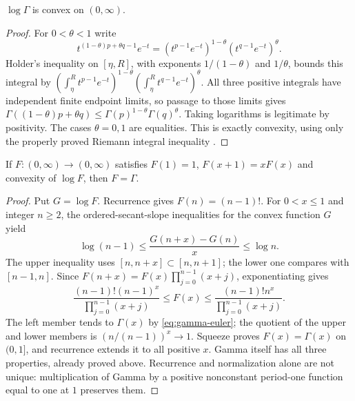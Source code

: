 \begin{theorem}
$\log\Gamma$ is convex on $(0,\infty)$.
\end{theorem}
\begin{proof}
For $0<\theta<1$ write
\[
 t^{(1-\theta)p+\theta q-1}e^{-t}
 =(t^{p-1}e^{-t})^{1-\theta}(t^{q-1}e^{-t})^\theta.
\]
Holder's inequality on $[\eta,R]$, with exponents $1/(1-\theta)$ and
$1/\theta$, bounds this integral by
$(\int_\eta^R t^{p-1}e^{-t})^{1-\theta}
 (\int_\eta^R t^{q-1}e^{-t})^\theta$.
All three positive integrals have independent finite endpoint limits, so passage
to those limits gives
$\Gamma((1-\theta)p+\theta q)\leq\Gamma(p)^{1-\theta}\Gamma(q)^\theta$.
Taking logarithms is legitimate by positivity. The cases $\theta=0,1$ are
equalities. This is exactly convexity, using only the properly proved
Riemann integral inequality .
\end{proof}

\begin{theorem}
If $F:(0,\infty)\to(0,\infty)$ satisfies $F(1)=1$,
$F(x+1)=xF(x)$ and convexity of $\log F$, then $F=\Gamma$.
\end{theorem}
\begin{proof}
Put $G=\log F$. Recurrence gives $F(n)=(n-1)!$.
For $0<x\leq1$ and integer $n\geq2$, the ordered-secant-slope inequalities
for the convex function $G$ yield
\[
 \log(n-1)\leq\frac{G(n+x)-G(n)}x\leq\log n.
\]
The upper inequality uses $[n,n+x]\subset[n,n+1]$; the lower one compares
with $[n-1,n]$. Since
$F(n+x)=F(x)\prod_{j=0}^{n-1}(x+j)$, exponentiating gives
\[
 \frac{(n-1)!(n-1)^x}{\prod_{j=0}^{n-1}(x+j)}
 \leq F(x)\leq
 \frac{(n-1)!n^x}{\prod_{j=0}^{n-1}(x+j)}.
\]
The left member tends to $\Gamma(x)$ by \eqref{eq:gamma-euler}; the quotient
of the upper and lower members is $(n/(n-1))^x\to1$. Squeeze proves
$F(x)=\Gamma(x)$ on $(0,1]$, and recurrence extends it to all positive $x$.
Gamma itself has all three properties, already proved above. Recurrence and
normalization alone are not unique: multiplication of Gamma by a positive
nonconstant period-one function equal to one at $1$ preserves them.
\end{proof}

